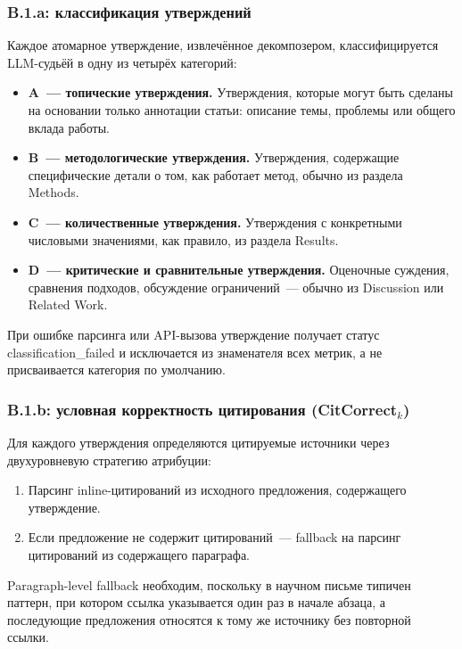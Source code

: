 \documentclass[a4paper,14pt]{extarticle}
\begin{document}
\subsubsection{B.1.a: классификация утверждений}

Каждое атомарное утверждение, извлечённое декомпозером, классифицируется LLM-судьёй в одну из четырёх категорий:

\begin{itemize}
    \item \textbf{A~--- топические утверждения.} Утверждения, которые могут быть сделаны на основании только аннотации статьи: описание темы, проблемы или общего вклада работы.
    \item \textbf{B~--- методологические утверждения.} Утверждения, содержащие специфические детали о том, как работает метод, обычно из раздела Methods.
    \item \textbf{C~--- количественные утверждения.} Утверждения с конкретными числовыми значениями, как правило, из раздела Results.
    \item \textbf{D~--- критические и сравнительные утверждения.} Оценочные суждения, сравнения подходов, обсуждение ограничений~--- обычно из Discussion или Related Work.
\end{itemize}

При ошибке парсинга или API-вызова утверждение получает статус classification\_failed и исключается из знаменателя всех метрик, а не присваивается категория по умолчанию.


\subsubsection{B.1.b: условная корректность цитирования (CitCorrect$_k$)}

Для каждого утверждения определяются цитируемые источники через двухуровневую стратегию атрибуции:

\begin{enumerate}
    \item Парсинг inline-цитирований из исходного предложения, содержащего утверждение.
    \item Если предложение не содержит цитирований~--- fallback на парсинг цитирований из содержащего параграфа.
\end{enumerate}

Paragraph-level fallback необходим, поскольку в научном письме типичен паттерн, при котором ссылка указывается один раз в начале абзаца, а последующие предложения относятся к тому же источнику без повторной ссылки.
\end{document}
